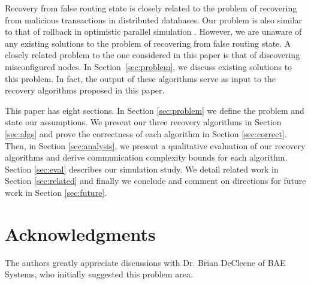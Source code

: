 \documentclass[10pt,conference]{IEEEtran}
\begin{document}
Recovery from false routing state is closely related to the problem of
recovering from malicious transactions \cite{Liu98,Liu00} in
distributed databases. Our problem is also similar to that of rollback
in optimistic parallel simulation \cite{Jeff}. However, we are unaware
of any existing solutions to the problem of recovering from false
routing state. A closely related problem to the one considered in this
paper is that of discovering misconfigured nodes. In
Section~\ref{sec:problem}, we discuss existing solutions to this
problem. In fact, the output of these algorithms serve as input to the
recovery algorithms proposed in this paper.

This paper has eight sections. In Section \ref{sec:problem} we define the problem and state our assumptions.
We present our three recovery algorithms in Section \ref{sec:algs} and prove the correctness of each algorithm in Section \ref{sec:correct}.
Then, in Section \ref{sec:analysis}, we present a qualitative evaluation 
of our recovery algorithms and derive communication complexity bounds for each algorithm. 
Section \ref{sec:eval} describes our simulation study. We detail related work in Section \ref{sec:related} and finally we conclude and 
comment on directions for future work in Section \ref{sec:future}.























\section{Acknowledgments}
The authors greatly appreciate discussions with Dr. Brian DeCleene of BAE Systems, who initially suggested this problem area.







\end{document}
